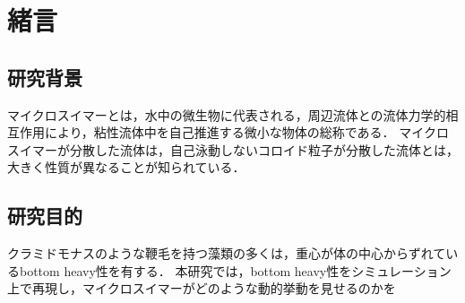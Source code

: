 \documentclass[11pt, a4j, dvipdfmx]{jarticle}
\begin{document}
\section{緒言}

\subsection{研究背景}
\par
マイクロスイマーとは，水中の微生物に代表される，周辺流体との流体力学的相互作用により，粘性流体中を自己推進する微小な物体の総称である．
マイクロスイマーが分散した流体は，自己泳動しないコロイド粒子が分散した流体とは，大きく性質が異なることが知られている．


\subsection{研究目的}
\par
クラミドモナスのような鞭毛を持つ藻類の多くは，重心が体の中心からずれているbottom heavy性を有する．
本研究では，bottom heavy性をシミュレーション上で再現し，マイクロスイマーがどのような動的挙動を見せるのかを
\end{document}
